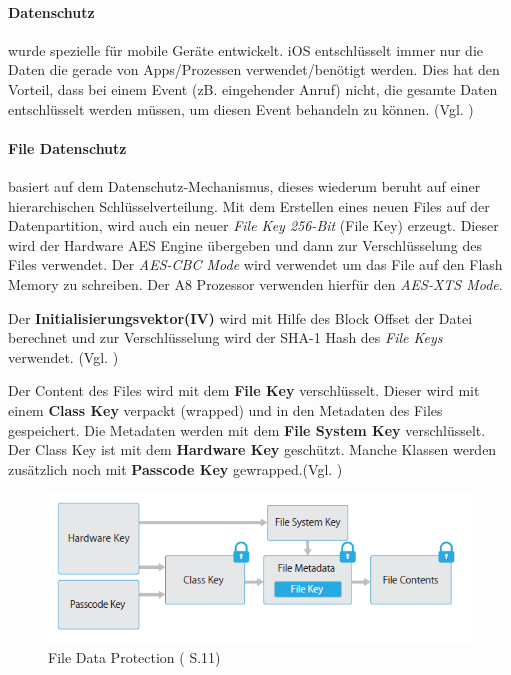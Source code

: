\paragraph{Datenschutz} wurde spezielle für mobile Geräte entwickelt. iOS entschlüsselt immer nur die Daten die gerade von Apps/Prozessen verwendet/benötigt werden. Dies hat den Vorteil, dass bei einem Event (zB. eingehender Anruf) nicht, die gesamte Daten entschlüsselt werden müssen, um diesen Event behandeln zu können. (Vgl. \cite{Apple[4]})

\paragraph{File Datenschutz} basiert auf dem Datenschutz-Mechanismus, dieses wiederum beruht auf einer hierarchischen Schlüsselverteilung. Mit dem Erstellen eines neuen Files auf der Datenpartition, wird auch ein neuer \textit{\glqq File Key 256-Bit\grqq{}} (\glqq File Key\grqq) erzeugt. Dieser wird der Hardware AES Engine übergeben und dann zur Verschlüsselung des Files verwendet.  Der \textit{\glqq AES-CBC Mode\grqq{}} wird verwendet um das File auf den Flash Memory zu schreiben. Der A8 Prozessor verwenden hierfür den \textit{\glqq AES-XTS Mode\grqq{}}.  \par
Der \textbf{Initialisierungsvektor(IV)} wird mit Hilfe des Block Offset der Datei berechnet und zur Verschlüsselung wird der SHA-1 Hash des \textit{\glqq File Keys\grqq{}} verwendet. (Vgl. \cite{iOSSec[5], iOSSec[2],iOSSec[1], Apple[4], Apple[5], Apple[6], Apple[3]})

Der Content des Files wird mit dem \textbf{File Key} verschlüsselt. Dieser wird mit einem \textbf{Class Key} verpackt (wrapped) und in den Metadaten des Files gespeichert. Die Metadaten werden mit dem \textbf{File System Key} verschlüsselt. Der Class Key ist mit dem \textbf{Hardware Key} geschützt. Manche Klassen werden zusätzlich noch mit \textbf{Passcode Key} gewrapped.(Vgl. \cite{iOSSec[5], iOSSec[2],iOSSec[1], Apple[4], Apple[5], Apple[6], Apple[3]})
\begin{figure}[!ht]
        \centering
        \includegraphics[scale=0.9]{fileDataProtection.PNG}
        \caption{File Data Protection (\cite{Apple[4]} S.11)}
        \label{fig:FileDataProtection}
\end{figure}

